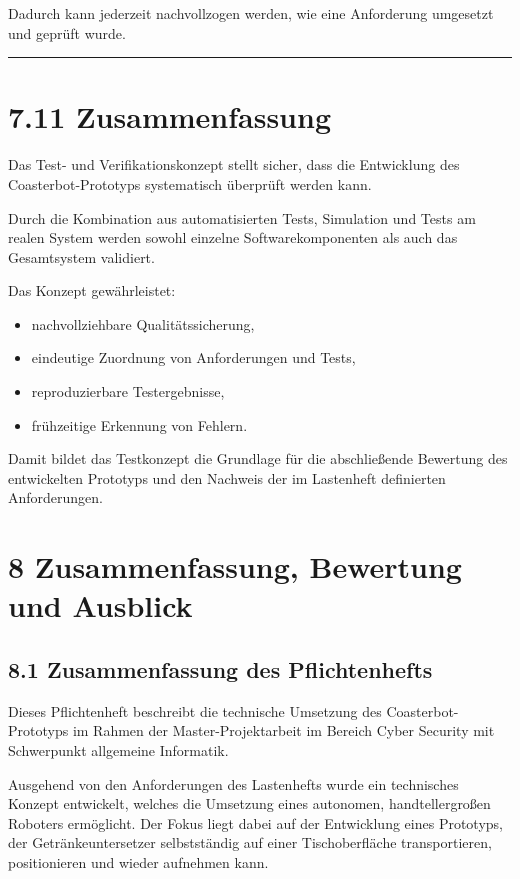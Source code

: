 \documentclass[
  a4paper,
  12pt,
  DIV=12,        %
  parskip=half,  %
  headings=small %
]{scrartcl}
\theoremstyle{definition}
\providecommand{\tightlist}{%
  \setlength{\itemsep}{0pt}\setlength{\parskip}{0pt}}
\theoremstyle{definition}
\providecommand{\tightlist}{%
  \setlength{\itemsep}{0pt}\setlength{\parskip}{0pt}}
\begin{document}
Dadurch kann jederzeit nachvollzogen werden, wie eine Anforderung
umgesetzt und geprüft wurde.

\begin{center}\rule{0.5\linewidth}{0.5pt}\end{center}

\section{7.11 Zusammenfassung}\label{zusammenfassung-5}

Das Test- und Verifikationskonzept stellt sicher, dass die Entwicklung
des Coasterbot-Prototyps systematisch überprüft werden kann.

Durch die Kombination aus automatisierten Tests, Simulation und Tests am
realen System werden sowohl einzelne Softwarekomponenten als auch das
Gesamtsystem validiert.

Das Konzept gewährleistet:

\begin{itemize}
\tightlist
\item
  nachvollziehbare Qualitätssicherung,
\item
  eindeutige Zuordnung von Anforderungen und Tests,
\item
  reproduzierbare Testergebnisse,
\item
  frühzeitige Erkennung von Fehlern.
\end{itemize}

Damit bildet das Testkonzept die Grundlage für die abschließende
Bewertung des entwickelten Prototyps und den Nachweis der im Lastenheft
definierten Anforderungen.

\section{8 Zusammenfassung, Bewertung und
Ausblick}\label{zusammenfassung-bewertung-und-ausblick}

\subsection{8.1 Zusammenfassung des
Pflichtenhefts}\label{zusammenfassung-des-pflichtenhefts}

Dieses Pflichtenheft beschreibt die technische Umsetzung des
Coasterbot-Prototyps im Rahmen der Master-Projektarbeit im Bereich Cyber
Security mit Schwerpunkt allgemeine Informatik.

Ausgehend von den Anforderungen des Lastenhefts wurde ein technisches
Konzept entwickelt, welches die Umsetzung eines autonomen,
handtellergroßen Roboters ermöglicht. Der Fokus liegt dabei auf der
Entwicklung eines Prototyps, der Getränkeuntersetzer selbstständig auf
einer Tischoberfläche transportieren, positionieren und wieder aufnehmen
kann.
\end{document}
